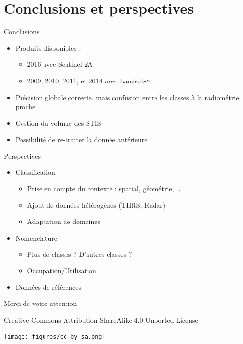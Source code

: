 \documentclass[pressentation,10pt,aspectratio=1610, xcolor=table]{beamer}
\begin{document}
\section{Conclusions et perspectives}
\label{sec:org6034874}
\begin{frame}[label={sec:org9038651}]{Conclusions}
\begin{itemize}
\item Produits disponibles : 
\begin{itemize}
\item 2016 avec Sentinel 2A
\item 2009, 2010, 2011, et 2014 avec Landsat-8
\end{itemize}
\item Précision globale correcte, mais confusion entre les classes à la radiométrie proche
\item Gestion du volume des STIS
\item Possibilité de re-traiter la donnée antérieure
\end{itemize}
\end{frame}
\begin{frame}[label={sec:org96d29a2}]{Perspectives}
\begin{itemize}
\item Classification
\begin{itemize}
\item Prise en compte du contexte : spatial, géométrie, \ldots{}
\item Ajout de données hétérogènes (THRS, Radar)
\item Adaptation de domaines
\end{itemize}
\item Nomenclature
\begin{itemize}
\item Plus de classes ? D'autres classes ?
\item Occupation/Utilisation
\end{itemize}
\item Données de références
\end{itemize}
\end{frame}
\begin{frame}[label=conclusion,standout]{}
\begin{center}
Merci de votre attention
\end{center}
\end{frame}
\begin{frame}[label={sec:org3177e75}]{}
\begin{center}
\tiny Creative Commons Attribution-ShareAlike 4.0 Unported License
\normalsize

\begin{center}
\texttt{[image: figures/cc-by-sa.png]}
\end{center}
\end{center}
\end{frame}
\end{document}
